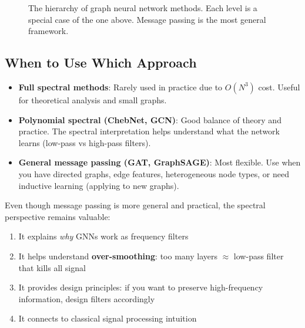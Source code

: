 \begin{notechapter}
\begin{figure}[H]
\caption{The hierarchy of graph neural network methods. Each level is 
         a special case of the one above. Message passing is the most 
         general framework.}
\label{dft-to-gnn:fig:hierarchy}
\end{figure}

\subsection{When to Use Which Approach}

\begin{itemize}
    \item \textbf{Full spectral methods}: Rarely used in practice due 
          to $O(N^3)$ cost. Useful for theoretical analysis and small 
          graphs.
    
    \item \textbf{Polynomial spectral (ChebNet, GCN)}: Good balance of 
          theory and practice. The spectral interpretation helps 
          understand what the network learns (low-pass vs high-pass 
          filters).
    
    \item \textbf{General message passing (GAT, GraphSAGE)}: Most 
          flexible. Use when you have directed graphs, edge features, 
          heterogeneous node types, or need inductive learning (applying 
          to new graphs).
\end{itemize}

\begin{remark}
Even though message passing is more general and practical, the spectral 
perspective remains valuable:

\begin{enumerate}
    \item It explains \emph{why} GNNs work as frequency filters
    \item It helps understand \textbf{over-smoothing}: too many layers 
          $\approx$ low-pass filter that kills all signal
    \item It provides design principles: if you want to preserve 
          high-frequency information, design filters accordingly
    \item It connects to classical signal processing intuition
\end{enumerate}


\end{remark}
\end{notechapter}
